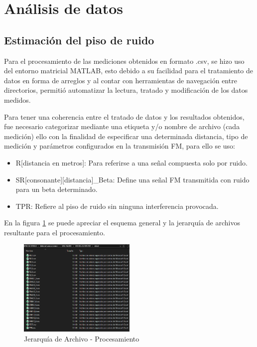 \documentclass[conference]{IEEEtran}
\begin{document}
	
	\section{Análisis de datos}
	
	\subsection{ Estimación del piso de ruido }
	
	Para el procesamiento de las mediciones obtenidos en formato .csv, se hizo uso del entorno matricial MATLAB, esto debido a su facilidad para el tratamiento de datos en forma de arreglos y al contar con herramientas de navegación entre directorios, permitió automatizar la lectura, tratado y modificación de los datos medidos.
	
	Para tener una coherencia entre el tratado de datos y los resultados obtenidos, fue necesario categorizar mediante una etiqueta y/o nombre de archivo (cada medición) ello con la finalidad de especificar una determinada distancia, tipo de medición y parámetros configurados en la transmisión FM, para ello se uso:
	
	\begin{itemize}
		\item R[distancia en metros]: Para referirse a una señal compuesta solo por ruido.
		\item SR[consonante][distancia]\_Beta: Define una señal FM transmitida con ruido para un beta determinado.
		\item TPR: Refiere al piso de ruido sin ninguna interferencia provocada.
	\end{itemize}
	
	En la figura \ref{fig:jerarquia-archivos} se puede apreciar el esquema general y la jerarquía de archivos resultante para el procesamiento.
	
	\begin{figure}[h]
		\centering
		\includegraphics[width=0.5\textwidth]{media/jerarquia-archivos}
		\caption{Jerarquía de Archivo - Procesamiento}
		\label{fig:jerarquia-archivos}
	\end{figure}
	
\end{document}
